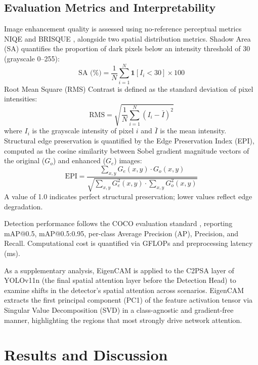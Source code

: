 \documentclass[conference]{IEEEtran}
\begin{document}
\subsection{Evaluation Metrics and Interpretability}
Image enhancement quality is assessed using no-reference perceptual metrics NIQE \cite{mittal2013niqe} and BRISQUE \cite{mittal2012brisque}, alongside two spatial distribution metrics. Shadow Area (SA) quantifies the proportion of dark pixels below an intensity threshold of 30 (grayscale 0--255):
\begin{equation}
  \text{SA (\%)} = \frac{1}{N} \sum_{i=1}^{N} \mathbf{1}[I_i < 30] \times 100
  \label{eq:shadow}
\end{equation}
Root Mean Square (RMS) Contrast is defined as the standard deviation of pixel intensities:
\begin{equation}
  \text{RMS} = \sqrt{\frac{1}{N}\sum_{i=1}^{N}(I_i - \bar{I})^2}
  \label{eq:rms}
\end{equation}
where $I_i$ is the grayscale intensity of pixel $i$ and $\bar{I}$ is the mean intensity. Structural edge preservation is quantified by the Edge Preservation Index (EPI), computed as the cosine similarity between Sobel gradient magnitude vectors of the original ($G_o$) and enhanced ($G_e$) images:
\begin{equation}
  \text{EPI} = \frac{\sum_{x,y} G_e(x,y) \cdot G_o(x,y)}
                    {\sqrt{\sum_{x,y} G_e^2(x,y) \cdot \sum_{x,y} G_o^2(x,y)}}
  \label{eq:epi}
\end{equation}
A value of 1.0 indicates perfect structural preservation; lower values reflect edge degradation.

Detection performance follows the COCO evaluation standard \cite{padilla2021metrics,lin2014coco}, reporting mAP@0.5, mAP@0.5:0.95, per-class Average Precision (AP), Precision, and Recall. Computational cost is quantified via GFLOPs \cite{akavaram2025flops} and preprocessing latency (ms).

As a supplementary analysis, EigenCAM \cite{muhammad2020eigencam} is applied to the C2PSA layer of YOLOv11n (the final spatial attention layer before the Detection Head) to examine shifts in the detector's spatial attention across scenarios. EigenCAM extracts the first principal component (PC1) of the feature activation tensor via Singular Value Decomposition (SVD) in a class-agnostic and gradient-free manner, highlighting the regions that most strongly drive network attention.

\section{Results and Discussion}
\end{document}
